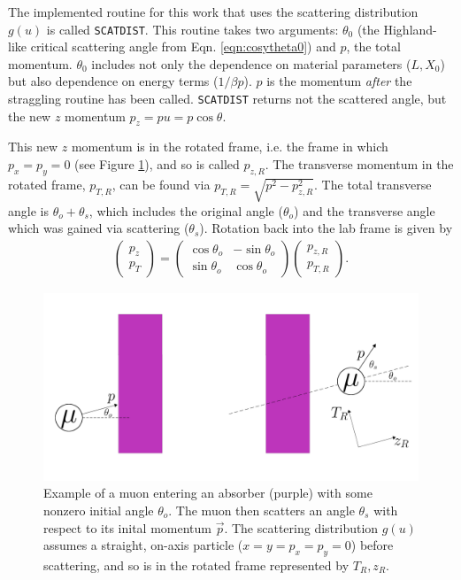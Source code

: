 The implemented routine for this work that uses the scattering distribution $g(u)$ is called \texttt{SCATDIST}. This routine takes two arguments: $\theta_0$ (the Highland-like critical scattering angle from Eqn. \ref{eqn:cosytheta0}) and $p$, the total momentum. $\theta_0$ includes not only the dependence on material parameters ($L, X_0$) but also dependence on energy terms ($1/\beta p$). $p$ is the momentum \textit{after} the straggling routine has been called. \texttt{SCATDIST} returns not the scattered angle, but the new $z$ momentum $p_z=pu=p\cos\theta$. 

This new $z$ momentum is in the rotated frame, i.e. the frame in which $p_x=p_y=0$ (see Figure \ref{fig:cosyRotatedFrame}), and so is called $p_{z,R}$. The transverse momentum in the rotated frame, $p_{T,R}$, can be found via $p_{T,R}=\sqrt{p^2-p_{z,R}^2}$. The total transverse angle is $\theta_o + \theta_s$, which includes the original angle ($\theta_o$) and the transverse angle which was gained via scattering ($\theta_s$). Rotation back into the lab frame is given by
\begin{align*}
\begin{pmatrix}
p_{z} \\ p_T
\end{pmatrix}
=
\begin{pmatrix}
\cos\theta_o & -\sin\theta_o\\
\sin\theta_o & \cos\theta_o
\end{pmatrix}
\begin{pmatrix}
p_{z,R} \\ p_{T,R}
\end{pmatrix}.
\end{align*}

\begin{figure}
  \centering
    \includegraphics[width=\textwidth]{Figures/cosyRotatedFrame} 
  \caption[Example of a muon entering an absorber with some nonzero initial angle.]{Example of a muon entering an absorber (purple) with some nonzero initial angle $\theta_o$. The muon then scatters an angle $\theta_s$ with respect to its inital momentum $\vec{p}$. The scattering distribution $g(u)$ assumes a straight, on-axis particle ($x=y=p_x=p_y=0$) before scattering, and so is in the rotated frame represented by $T_R, z_R$.}
  \label{fig:cosyRotatedFrame}
\end{figure}

